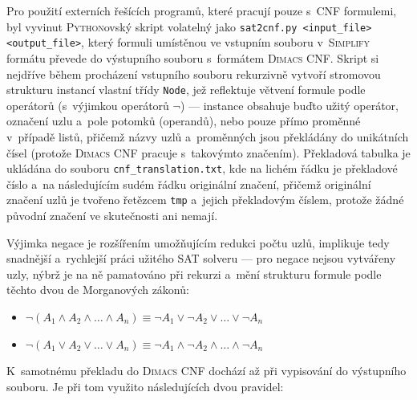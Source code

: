 \documentclass[11pt, titlepage]{report}
\begin{document}
Pro použití externích řešících programů, které pracují pouze s~CNF formulemi, byl vyvinut \textsc{Python}ovský skript volatelný jako \texttt{sat2cnf.py <input\_file> <output\_file>}, který formuli umístěnou ve vstupním souboru v~\textsc{Simplify} formátu převede do výstupního souboru s~formátem \textsc{Dimacs CNF}. Skript si nejdříve během procházení vstupního souboru rekurzivně vytvoří stromovou strukturu instancí vlastní třídy \texttt{Node}, jež reflektuje větvení formule podle operátorů (s~výjimkou operátorů $\neg$) --- instance obsahuje buďto užitý operátor, označení uzlu a~pole potomků (operandů), nebo pouze přímo proměnné v~případě listů, přičemž názvy uzlů a~proměnných jsou překládány do unikátních čísel (protože \textsc{Dimacs CNF} pracuje s~takovýmto značením). Překladová tabulka je ukládána do souboru \texttt{cnf\_translation.txt}, kde na lichém řádku je překladové číslo a~na následujícím sudém řádku originální značení, přičemž originální značení uzlů je tvořeno řetězcem \texttt{tmp} a~jejich překladovým číslem, protože žádné původní značení ve skutečnosti ani nemají.

Výjimka negace je rozšířením umožňujícím redukci počtu uzlů, implikuje tedy snadnější a~rychlejší práci užitého SAT solveru --- pro negace nejsou vytvářeny uzly, nýbrž je na ně pamatováno při rekurzi a~mění strukturu formule podle těchto dvou de Morganových zákonů:

\begin{itemize}
\item $\neg (A_{1} \wedge A_{2} \wedge \dots \wedge A_{n}) \equiv \neg A_{1} \vee \neg A_{2} \vee \dots \vee \neg A_{n}$
\item $\neg (A_{1} \vee A_{2} \vee \dots \vee A_{n}) \equiv \neg A_{1} \wedge \neg A_{2} \wedge \dots \wedge \neg A_{n}$
\end{itemize}

K~samotnému překladu do \textsc{Dimacs CNF} dochází až při vypisování do výstupního souboru. Je při tom využito následujících dvou pravidel:
\end{document}
